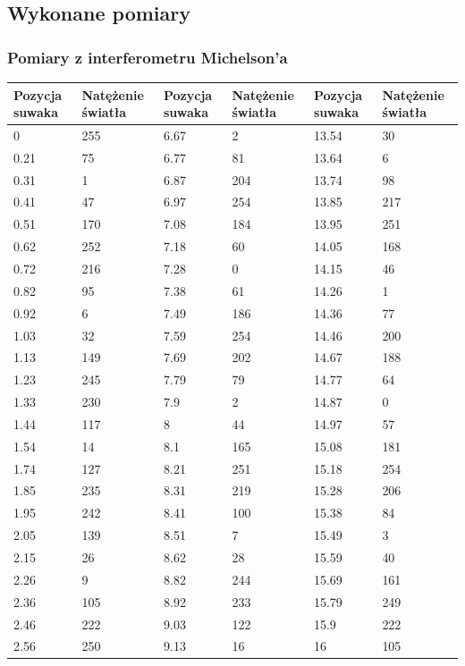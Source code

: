 \documentclass{article}
\begin{document}
\subsection{Wykonane pomiary}
\subsubsection{Pomiary z interferometru Michelson'a}
\begin{table}[h!]
\tiny
\centering
\begin{tabular}{|l|l|l|l|l|l|}
\hline
Pozycja suwaka & Natężenie światła & Pozycja suwaka & Natężenie światła	&	Pozycja suwaka & Natężenie światła\\ \hline
0	&	255	&	6.67	&	2	&	13.54	&	30	\\
0.21	&	75	&	6.77	&	81	&	13.64	&	6	\\
0.31	&	1	&	6.87	&	204	&	13.74	&	98	\\
0.41	&	47	&	6.97	&	254	&	13.85	&	217	\\
0.51	&	170	&	7.08	&	184	&	13.95	&	251	\\
0.62	&	252	&	7.18	&	60	&	14.05	&	168	\\
0.72	&	216	&	7.28	&	0	&	14.15	&	46	\\
0.82	&	95	&	7.38	&	61	&	14.26	&	1	\\
0.92	&	6	&	7.49	&	186	&	14.36	&	77	\\
1.03	&	32	&	7.59	&	254	&	14.46	&	200	\\
1.13	&	149	&	7.69	&	202	&	14.67	&	188	\\
1.23	&	245	&	7.79	&	79	&	14.77	&	64	\\
1.33	&	230	&	7.9	&	2	&	14.87	&	0	\\
1.44	&	117	&	8	&	44	&	14.97	&	57	\\
1.54	&	14	&	8.1	&	165	&	15.08	&	181	\\
1.74	&	127	&	8.21	&	251	&	15.18	&	254	\\
1.85	&	235	&	8.31	&	219	&	15.28	&	206	\\
1.95	&	242	&	8.41	&	100	&	15.38	&	84	\\
2.05	&	139	&	8.51	&	7	&	15.49	&	3	\\
2.15	&	26	&	8.62	&	28	&	15.59	&	40	\\
2.26	&	9	&	8.82	&	244	&	15.69	&	161	\\
2.36	&	105	&	8.92	&	233	&	15.79	&	249	\\
2.46	&	222	&	9.03	&	122	&	15.9	&	222	\\
2.56	&	250	&	9.13	&	16	&	16	&	105	\\

\end{tabular}
\end{table}
\end{document}
